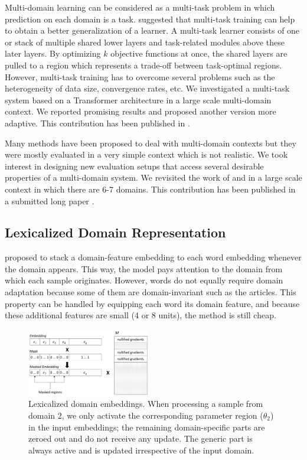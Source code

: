 \documentclass[12pt,a4paper,twoside]{report}
\theoremstyle{definition}
\begin{document}
Multi-domain learning can be considered as a multi-task problem in which prediction on each domain is a task. \cite{Caruana97multitask} suggested that multi-task training can help to obtain a better generalization of a learner. A multi-task learner consists of one or stack of multiple shared lower layers and task-related modules above these later layers. By optimizing $k$ objective functions at once, the shared layers are pulled to a region which represents a trade-off between task-optimal regions. However, multi-task training has to overcome several problems such as the heterogeneity of data size, convergence rates, etc. We investigated a multi-task system based on a Transformer architecture \cite{Vaswani17attention} in a large scale multi-domain context. We reported promising results and proposed another version more adaptive. This contribution has been published in \cite{Pham19generic}.

Many methods have been proposed to deal with multi-domain contexts but they were mostly evaluated in a very simple context which is not realistic. We took interest in designing new evaluation setups that access several desirable properties of a multi-domain system. We revisited the work of \cite{Britz17effective,Zheng18multi,Kobus17domain} and \cite{bapna19simple} in a large scale context in which there are 6-7 domains. This contribution has been published in a submitted long paper \citep{Pham20revisiting}.

\subsection*{Lexicalized Domain Representation}
\cite{Kobus17domain} proposed to stack a domain-feature embedding to each word embedding whenever the domain appears. This way, the model pays attention to the domain from which each sample originates. However, words do not equally require domain adaptation because some of them are domain-invariant such as the articles. This property can
be handled by equipping each word its domain feature, and because these additional features are small (4 or 8 units), the method is still cheap.
\begin{figure}[h!]
  \centering
  \includegraphics[width=0.48\textwidth]{embeddings}
  \caption{Lexicalized domain embeddings. When processing a sample from domain $2$, we only activate the corresponding parameter region ($\theta_2$) in the input embeddings; the remaining domain-specific parts are zeroed out and do not receive any update. The generic part is always active and is updated irrespective of the input domain.} 
  \label{fig:network}
\end{figure}
\end{document}
